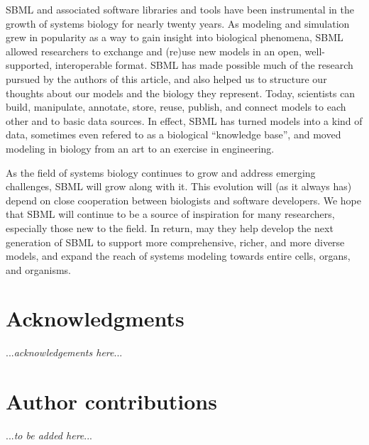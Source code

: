 \documentclass{sbml-paper}
\begin{document}
SBML and associated software libraries and tools have been instrumental in the growth of systems biology for nearly twenty years.  As modeling and simulation grew in popularity as a way to gain insight into biological phenomena, SBML allowed researchers to exchange and (re)use new models in an open, well-supported, interoperable format. SBML has made possible much of the research pursued by the authors of this article, and also helped us to structure our thoughts about our models and the biology they represent.  Today, scientists can build, manipulate, annotate, store, reuse, publish, and connect models to each other and to basic data sources.  In effect, SBML has turned models into a kind of data, sometimes even refered to as a biological ``knowledge base'', and moved modeling in biology from an art to an exercise in engineering.

As the field of systems biology continues to grow and address emerging challenges, SBML will grow along with it.  This evolution will (as it always has) depend on close cooperation between biologists and software developers.  We hope that SBML will continue to be a source of inspiration for many researchers, especially those new to the field.  In return, may they help develop the next generation of SBML to support more comprehensive, richer, and more diverse models, and expand the reach of systems modeling towards entire cells, organs, and organisms.


\section{Acknowledgments}

...\emph{acknowledgements here}...


\section{Author contributions}

...\emph{to be added here}...



\clearpage



\end{document}
